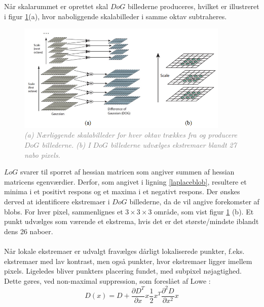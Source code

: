 Når skalarummet er oprettet skal $DoG$ billederne produceres, hvilket er illustreret i figur \ref{fig:difference}(a), hvor naboliggende skalabilleder i samme oktav subtraheres. \begin{figure}[H]
    \centering
    \includegraphics[width=0.90\textwidth]{fig/30.png}
     \vspace{-1em}
    \begin{center}    
       \caption{\textcolor{gray}{\footnotesize \textit{(a) Nærliggende skalabilleder for hver oktav trækkes fra og producere $DoG$ billederne. (b) I  $DoG$ billederne udvælges ekstremaer blandt 27 nabo pixels.}}}
    \label{fig:difference}
     \end{center}
     \vspace{-2.5em}
  \end{figure} \noindent    
$LoG$ svarer til sporret af hessian matricen som angiver summen af hessian matricens egenværdier. Derfor, som angivet i ligning \eqref{laplaceblob}, resultere et minima i et positivt respons og et maxima i et negativt respons. Der ønskes derved at identificere ekstremaer i $DoG$ billederne, da de vil angive forekomster af blobs. For hver pixel, sammenlignes et $3\times3\times3$ område, som vist figur \ref{fig:difference} (b). Et punkt udvælges som værende et ekstrema, hvis det er det største/mindste iblandt dens 26 naboer.
\\
\\
Når lokale ekstremaer er udvalgt fravælges dårligt lokaliserede punkter, f.eks. ekstremaer med lav kontrast, men også punkter, hvor ekstremaer ligger imellem pixels. Ligeledes bliver punkters placering fundet, med subpixel nøjagtighed. Dette gøres, ved non-maximal suppression, som foreslået af Lowe \cite{nonmaximalsuppression}:
\begin{equation}
D(x)=D+\dfrac{\partial D^T}{\partial x}x\dfrac{1}{2}x^T\dfrac{\partial^2D}{\partial x^2}x
\label{nonmax}
\end{equation}
